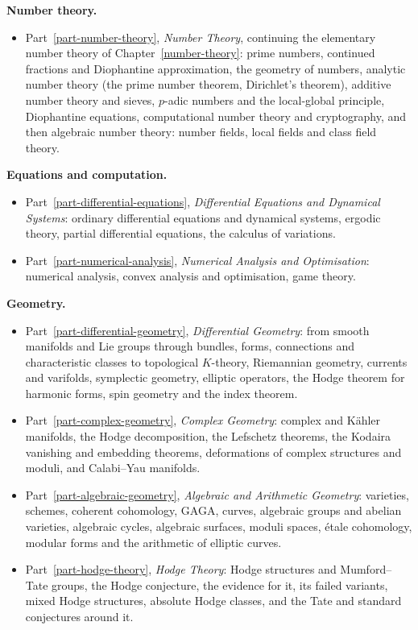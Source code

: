 \noindent\textbf{Number theory.}
\begin{itemize}
\item Part~\ref{part-number-theory}, \emph{Number Theory}, continuing the
elementary number theory of Chapter~\ref{number-theory}: prime numbers,
continued fractions and Diophantine approximation, the geometry of numbers,
analytic number theory (the prime number theorem, Dirichlet's theorem),
additive number theory and sieves, $p$-adic numbers and the local-global
principle, Diophantine equations, computational number theory and
cryptography, and then algebraic number theory: number
fields, local fields and class field theory.
\end{itemize}

\noindent\textbf{Equations and computation.}
\begin{itemize}
\item Part~\ref{part-differential-equations}, \emph{Differential Equations and
Dynamical Systems}: ordinary differential equations and dynamical systems,
ergodic theory, partial differential equations, the calculus of variations.
\item Part~\ref{part-numerical-analysis}, \emph{Numerical Analysis and
Optimisation}: numerical analysis, convex analysis and optimisation, game
theory.
\end{itemize}

\noindent\textbf{Geometry.}
\begin{itemize}
\item Part~\ref{part-differential-geometry}, \emph{Differential Geometry}: from
smooth manifolds and Lie groups through bundles, forms, connections and
characteristic classes to topological $K$-theory, Riemannian geometry,
currents and varifolds, symplectic geometry, elliptic operators, the Hodge
theorem for harmonic forms, spin geometry and the index theorem.
\item Part~\ref{part-complex-geometry}, \emph{Complex Geometry}: complex and
K\"ahler manifolds, the Hodge decomposition, the Lefschetz theorems, the
Kodaira vanishing and embedding theorems, deformations of complex structures and
moduli, and Calabi--Yau manifolds.
\item Part~\ref{part-algebraic-geometry}, \emph{Algebraic and Arithmetic
Geometry}: varieties, schemes, coherent cohomology, GAGA, curves, algebraic
groups and abelian varieties, algebraic cycles, algebraic surfaces, moduli
spaces, \'etale
cohomology, modular forms and the arithmetic of elliptic curves.
\item Part~\ref{part-hodge-theory}, \emph{Hodge Theory}: Hodge structures and
Mumford--Tate groups, the Hodge conjecture, the evidence for it, its failed
variants, mixed Hodge structures, absolute Hodge classes, and the Tate and
standard conjectures around it.
\end{itemize}

